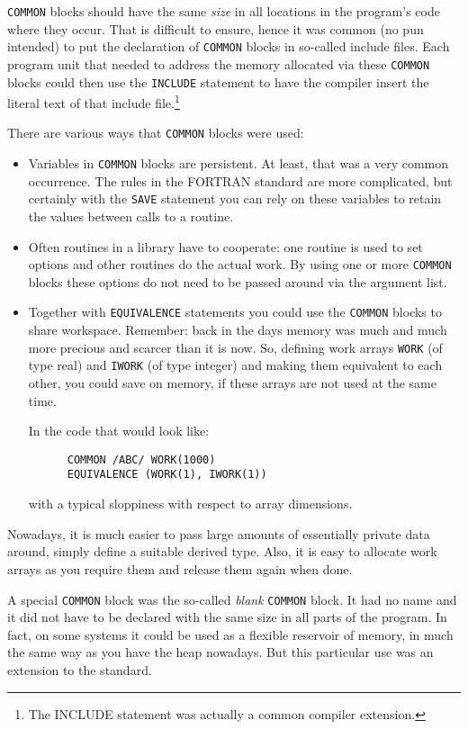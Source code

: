 \verb+COMMON+ blocks should have the same \emph{size} in all locations in the program's
code where they occur. That is difficult to ensure, hence it was common (no pun intended)
to put the declaration of \verb+COMMON+ blocks in so-called include files. Each program
unit that needed to address the memory allocated via these \verb+COMMON+ blocks could
then use the \verb+INCLUDE+ statement to have the compiler insert the literal text
of that include file.\footnote{The INCLUDE statement was actually a common compiler
extension.}

There are various ways that \verb+COMMON+ blocks were used:
\begin{itemize}
\item
Variables in \verb+COMMON+ blocks are persistent. At least, that was a very common
occurrence. The rules in the FORTRAN standard are more complicated, but certainly
with the \verb+SAVE+ statement you can rely on these variables to retain the
values between calls to a routine.
\item
Often routines in a library have to cooperate: one routine is used to set options
and other routines do the actual work. By using one or more \verb+COMMON+ blocks
these options do not need to be passed around via the argument list.
\item
Together with \verb+EQUIVALENCE+ statements you could use the \verb+COMMON+ blocks
to share workspace. Remember: back in the days memory was much and much more precious
and scarcer than it is now. So, defining work arrays \verb+WORK+ (of type real)
and \verb+IWORK+ (of type integer) and making them equivalent to each other, you
could save on memory, if these arrays are not used at the same time.

In the code that would look like:
\begin{verbatim}
      COMMON /ABC/ WORK(1000)
      EQUIVALENCE (WORK(1), IWORK(1))
\end{verbatim}
\noindent with a typical sloppiness with respect to array dimensions.

\end{itemize}
Nowadays, it is much easier to pass large amounts of essentially private data
around, simply define a suitable derived type. Also, it is easy to allocate
work arrays as you require them and release them again when done.

A special \verb+COMMON+ block was the so-called \emph{blank} \verb+COMMON+
block. It had no name and it did not have to be declared with the same size
in all parts of the program. In fact, on some systems it could be used as
a flexible reservoir of memory, in much the same way as you have the
heap nowadays. But this particular use was an extension to the standard.


